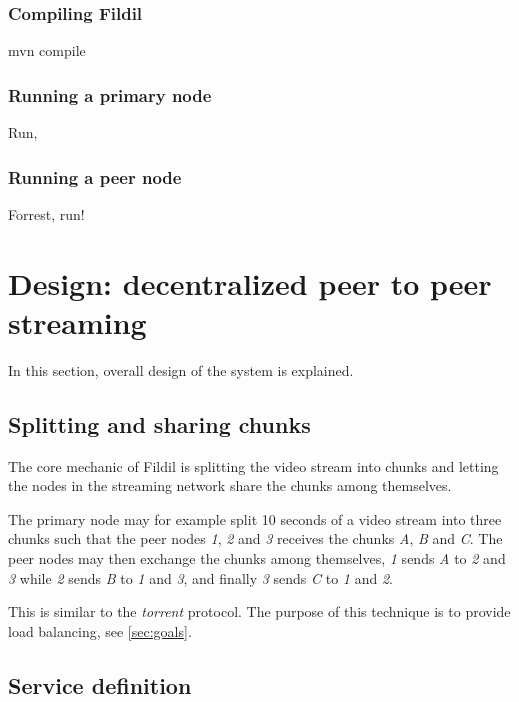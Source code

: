 \documentclass[10pt, a4paper]{article}
\begin{document}
\subsubsection{Compiling Fildil}

mvn compile

\subsubsection{Running a primary node}

Run,

\subsubsection{Running a peer node}

Forrest, run!

\section{Design: decentralized peer to peer streaming}
\label{sec:design}

In this section, overall design of the system is explained.

\subsection{Splitting and sharing chunks}

The core mechanic of Fildil is splitting the video stream into chunks
and letting the nodes in the streaming network share the chunks among
themselves. 

The primary node may for example split 10 seconds of a video stream
into three chunks such that the peer nodes \emph{1}, \emph{2} and
\emph{3} receives the chunks \emph{A}, \emph{B} and \emph{C}. The peer
nodes may then exchange the chunks among themselves, \emph{1}
sends \emph{A} to \emph{2} and \emph{3} while \emph{2} sends \emph{B}
to \emph{1} and \emph{3}, and finally \emph{3} sends \emph{C} to
\emph{1} and \emph{2}.

This is similar to the \emph{torrent} protocol. The purpose of this
technique is to provide load balancing, see \autoref{sec:goals}.


\subsection{Service definition}
\label{sec:protobuf}
\end{document}
